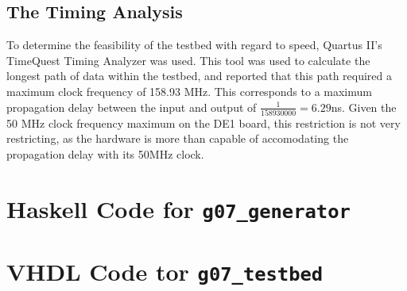 \documentclass[12pt]{report}
\begin{document}
\section*{The Timing Analysis}
To determine the feasibility of the testbed with regard to speed, Quartus II's TimeQuest Timing
Analyzer was used. This tool was used to calculate the longest path of data within the testbed, and
reported that this path required a maximum clock frequency of 158.93 MHz. This corresponds to a
maximum propagation delay between the input and output of $\frac{1}{158930000} = 6.29$ns. Given the
50 MHz clock
frequency maximum on the DE1 board, this restriction is not very restricting, as the hardware is
more than capable of accomodating the propagation delay with its 50MHz clock.
\begin{appendices}
	\chapter{Haskell Code for \texttt{g07\_generator}}
	\label{app:hs}
	
	\chapter{VHDL Code tor \texttt{g07\_testbed}}
	\label{app:testbedvhdl}
	

\end{appendices}
\end{document}

